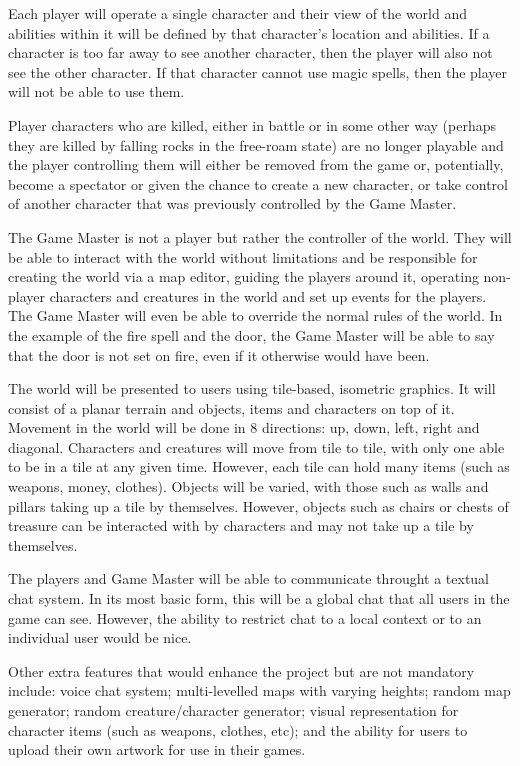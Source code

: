 \documentclass[11pt,fleqn,twoside]{article}
\begin{document}
Each player will operate a single character and their view of the world and abilities within it will be defined by that character's location and abilities. If a character is too far away to see another character, then the player will also not see the other character. If that character cannot use magic spells, then the player will not be able to use them.

Player characters who are killed, either in battle or in some other way (perhaps they are killed by falling rocks in the free-roam state) are no longer playable and the player controlling them will either be removed from the game or, potentially, become a spectator or given the chance to create a new character, or take control of another character that was previously controlled by the Game Master.

The Game Master is not a player but rather the controller of the world. They will be able to interact with the world without limitations and be responsible for creating the world via a map editor, guiding the players around it, operating non-player characters and creatures in the world and set up events for the players. The Game Master will even be able to override the normal rules of the world. In the example of the fire spell and the door, the Game Master will be able to say that the door is not set on fire, even if it otherwise would have been.

The world will be presented to users using tile-based, isometric graphics. It will consist of a planar terrain and objects, items and characters on top of it. Movement in the world will be done in 8 directions: up, down, left, right and diagonal. Characters and creatures will move from tile to tile, with only one able to be in a tile at any given time. However, each tile can hold many items (such as weapons, money, clothes). Objects will be varied, with those such as walls and pillars taking up a tile by themselves. However, objects such as chairs or chests of treasure can be interacted with by characters and may not take up a tile by themselves.

The players and Game Master will be able to communicate throught a textual chat system. In its most basic form, this will be a global chat that all users in the game can see. However, the ability to restrict chat to a local context or to an individual user would be nice.

Other extra features that would enhance the project but are not mandatory include: voice chat system; multi-levelled maps with varying heights; random map generator; random creature/character generator; visual representation for character items (such as weapons, clothes, etc); and the ability for users to upload their own artwork for use in their games.
\end{document}
